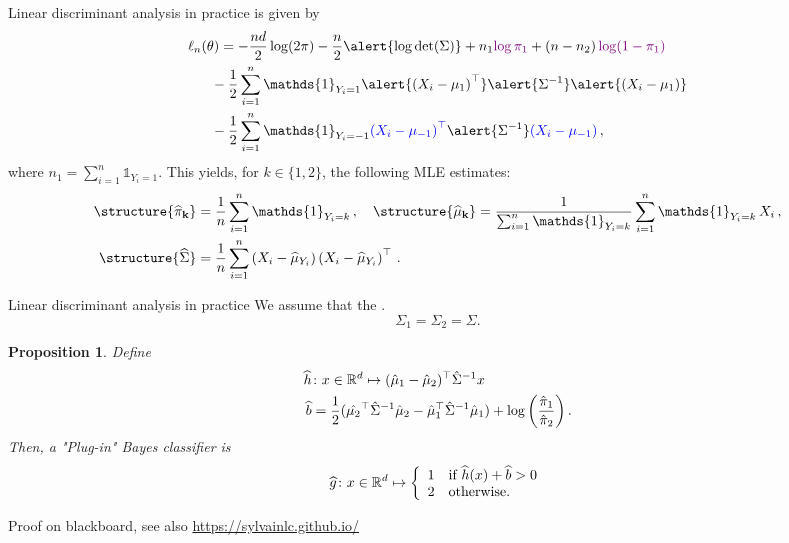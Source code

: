 \documentclass[xcolor={usenames,dvipsnames},handout]{beamer}
\newtheorem{prop}[theorem]{Proposition}
\begin{document}
\begin{frame}{Linear discriminant analysis in practice}
 is given by
\begin{align*}
\ell_n(\theta) &= - \frac{nd}{2} \log(2\pi)-\frac{n}2 \alert{\log\mathrm{\det}(\Sigma)} + n_1\textcolor{violet}{\log \pi_1} + \left(n-n_2\right)\textcolor{violet}{\log (1-\pi_{1})} \\
& \hspace{-.21cm}
-  \frac{1}{2}\sum_{i=1}^n\mathds{1}_{Y_i=1}\alert{\left(X_i - \mu_{1}\right)^\top}\alert{\Sigma^{-1}}\alert{\left(X_i - \mu_{1}\right)}\\
& \hspace{-.21cm} -  \frac{1}{2}\sum_{i=1}^n\mathds{1}_{Y_i=-1}\textcolor{blue}{\left(X_i - \mu_{-1}\right)^\top}\alert{\Sigma^{-1}}\textcolor{blue}{\left(X_i - \mu_{-1}\right)}\,,
\end{align*}
where $n_1 = \sum_{i=1}^n\mathds{1}_{Y_i=1}$. This yields, for $k\in\{1,2\}$,   the following MLE estimates:
\begin{align*}
\structure{{\bf \widehat \pi_k}} &= \frac{1}{n}\sum_{i=1}^n\mathds{1}_{Y_i=k}\,, \quad \structure{{\bf \widehat \mu_k}} = \frac{1}{\sum_{i=1}^n\mathds{1}_{Y_i=k}}\sum_{i=1}^n\mathds{1}_{Y_i=k}\,X_i\,,\\
\structure{{\widehat\Sigma}} &= \frac{1}{n}\sum_{i=1}^n \left(X_i - \widehat \mu_{Y_i}\right)\left(X_i - \widehat \mu_{Y_i}\right)^\top\,.
\end{align*}

\end{frame}

\begin{frame}{Linear discriminant analysis in practice}
	We assume that the .
	$$
		\Sigma_1 = \Sigma_2 = \Sigma.
	$$

	
	\begin{prop}
		Define 
		\begin{align*}
			\widehat{h} &\colon x \in \mathbb{R}^d \mapsto (\hat\mu_1-\hat\mu_2)^\top\hat{\Sigma}^{-1}x \\
			\widehat{b} &= \frac 12 (\hat{\mu_2}^\top\hat{\Sigma}^{-1}\hat{\mu}_2 - \hat{\mu}_1^\top\hat{\Sigma}^{-1}\hat{\mu}_1) + \log \left( \frac{\hat{\pi}_1}{\hat{\pi}_2} \right).
		\end{align*}
		Then, a "Plug-in" Bayes classifier is
		$$
			\widehat{g} \colon x \in \mathbb{R}^d \mapsto
			\left\{ \begin{array}{ll}
				1 & \text{if } \widehat{h}(x) + \widehat{b} > 0 \\
				2 & \text{otherwise}.
			\end{array} \right.
		$$
	\end{prop}

\centering
{\color{Vert} Proof on blackboard, see also \url{https://sylvainlc.github.io/}}

\end{frame}
\end{document}
